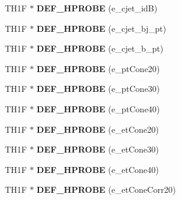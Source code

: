 \begin{DoxyCompactItemize}
\item 
\hypertarget{classHistos__Fake_a91c9ff7c06fd9a9689f5a31d56ddfe04}{
TH1F $\ast$ {\bfseries DEF\_\-HPROBE} (e\_\-cjet\_\-idB)}
\label{classHistos__Fake_a91c9ff7c06fd9a9689f5a31d56ddfe04}

\item 
\hypertarget{classHistos__Fake_a2b73d5296f68c587d4689ef1fa89bf42}{
TH1F $\ast$ {\bfseries DEF\_\-HPROBE} (e\_\-cjet\_\-bj\_\-pt)}
\label{classHistos__Fake_a2b73d5296f68c587d4689ef1fa89bf42}

\item 
\hypertarget{classHistos__Fake_a040ec7e61e9e93feb0fea4ebbaa0e350}{
TH1F $\ast$ {\bfseries DEF\_\-HPROBE} (e\_\-cjet\_\-b\_\-pt)}
\label{classHistos__Fake_a040ec7e61e9e93feb0fea4ebbaa0e350}

\item 
\hypertarget{classHistos__Fake_a237874bb9243ca9adb22a87655a7992a}{
TH1F $\ast$ {\bfseries DEF\_\-HPROBE} (e\_\-ptCone20)}
\label{classHistos__Fake_a237874bb9243ca9adb22a87655a7992a}

\item 
\hypertarget{classHistos__Fake_aecc7e2efebfc521cfc06aa455a9b5cf9}{
TH1F $\ast$ {\bfseries DEF\_\-HPROBE} (e\_\-ptCone30)}
\label{classHistos__Fake_aecc7e2efebfc521cfc06aa455a9b5cf9}

\item 
\hypertarget{classHistos__Fake_a0daf2246df8fe9c47f13b222c4620270}{
TH1F $\ast$ {\bfseries DEF\_\-HPROBE} (e\_\-ptCone40)}
\label{classHistos__Fake_a0daf2246df8fe9c47f13b222c4620270}

\item 
\hypertarget{classHistos__Fake_a6567d940167fab67ca9d1183f4fc9020}{
TH1F $\ast$ {\bfseries DEF\_\-HPROBE} (e\_\-etCone20)}
\label{classHistos__Fake_a6567d940167fab67ca9d1183f4fc9020}

\item 
\hypertarget{classHistos__Fake_a347cb8c00a2f719bac3957c010ba87af}{
TH1F $\ast$ {\bfseries DEF\_\-HPROBE} (e\_\-etCone30)}
\label{classHistos__Fake_a347cb8c00a2f719bac3957c010ba87af}

\item 
\hypertarget{classHistos__Fake_aa14b9d22e6b77679ed51e73df3666813}{
TH1F $\ast$ {\bfseries DEF\_\-HPROBE} (e\_\-etCone40)}
\label{classHistos__Fake_aa14b9d22e6b77679ed51e73df3666813}

\item 
\hypertarget{classHistos__Fake_a0dae20f41aea3643889d7e556c4ecd97}{
TH1F $\ast$ {\bfseries DEF\_\-HPROBE} (e\_\-etConeCorr20)}
\label{classHistos__Fake_a0dae20f41aea3643889d7e556c4ecd97}


\end{DoxyCompactItemize}
